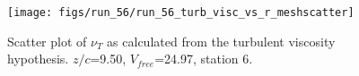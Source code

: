 \begin{figure}[H]
\centering
\texttt{[image: figs/run\_56/run\_56\_turb\_visc\_vs\_r\_meshscatter]}
\caption{Scatter plot of $\nu_T$ as calculated from the turbulent viscosity hypothesis. $z/c$=9.50, $V_{free}$=24.97, station 6.}
\label{fig:run_56_turb_visc_vs_r_meshscatter}
\end{figure}


